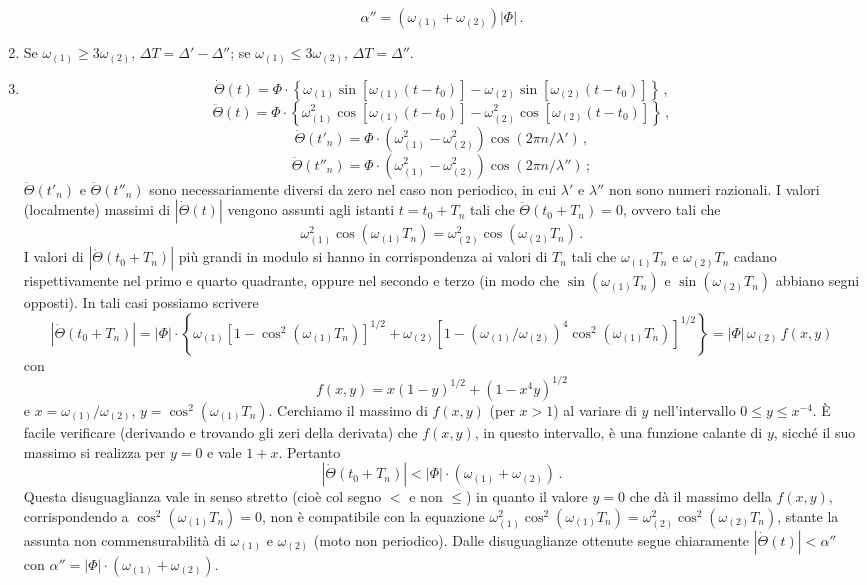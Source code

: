 \documentclass[11pt, a4paper]{book}
\numberwithin{equation}{section}
\begin{document}
\begin{enumerate}
\[        \alpha'' = (\omega_{(1)}+\omega_{(2)})|\Phi| \,.
    \]
    \item Se $\omega_{(1)} \geq 3\omega_{(2)}$, $\Delta T = \Delta' - \Delta''$; se
    $\omega_{(1)} \leq 3\omega_{(2)}$, $\Delta T = \Delta''$.
    \item
    \[
        \dot{\Theta}(t) = \Phi\cdot\left\{\omega_{(1)}\sin[\omega_{(1)}(t-t_0)]
        - \omega_{(2)}\sin[\omega_{(2)}(t-t_0)]\right\} \,,
    \]
    \[
        \ddot{\Theta}(t) = \Phi\cdot\left\{\omega_{(1)}^2\cos[\omega_{(1)}(t-t_0)]
        - \omega_{(2)}^2\cos[\omega_{(2)}(t-t_0)]\right\} \,,
    \]
    \[
        \ddot{\Theta}(t'_n) = \Phi\cdot(\omega_{(1)}^2-\omega_{(2)}^2)
        \cos(2\pi n/\lambda') \,,
    \]
    \[
        \ddot{\Theta}(t''_n) = \Phi\cdot(\omega_{(1)}^2-\omega_{(2)}^2)
        \cos(2\pi n/\lambda'') \,;
    \]
    $\ddot{\Theta}(t'_n)$ e $\ddot{\Theta}(t''_n)$ sono necessariamente diversi da
    zero nel caso non periodico, in cui $\lambda'$ e $\lambda''$ non sono numeri
    razionali. I valori (localmente) massimi di $|\dot{\Theta}(t)|$ vengono assunti
    agli istanti $t = t_0 + T_n$ tali che $\ddot{\Theta}(t_0+T_n)=0$, ovvero tali che
    \[
        \omega_{(1)}^2\cos(\omega_{(1)}T_n) = \omega_{(2)}^2\cos(\omega_{(2)}T_n) \,.
    \]
    I valori di $|\dot{\Theta}(t_0+T_n)|$ più grandi in modulo si hanno in
    corrispondenza ai valori di $T_n$ tali che $\omega_{(1)}T_n$ e $\omega_{(2)}T_n$
    cadano rispettivamente nel primo e quarto quadrante, oppure nel secondo e
    terzo (in modo che $\sin(\omega_{(1)}T_n)$ e $\sin(\omega_{(2)}T_n)$ abbiano
    segni opposti). In tali casi possiamo scrivere
    \[
        |\dot{\Theta}(t_0+T_n)| = |\Phi|\cdot\left\{
        \omega_{(1)}[1-\cos^2(\omega_{(1)}T_n)]^{1/2}
        + \omega_{(2)}[1-(\omega_{(1)}/\omega_{(2)})^4\cos^2(\omega_{(1)}T_n)]^{1/2}
        \right\} = |\Phi|\,\omega_{(2)}\,f(x,y)
    \]
    con
    \[
        f(x,y) = x(1-y)^{1/2} + (1-x^4 y)^{1/2}
    \]
    e $x = \omega_{(1)}/\omega_{(2)}$, $y = \cos^2(\omega_{(1)}T_n)$.
    Cerchiamo il massimo di $f(x,y)$ (per $x>1$) al variare di $y$
    nell'intervallo $0 \leq y \leq x^{-4}$. È facile verificare (derivando e
    trovando gli zeri della derivata) che $f(x,y)$, in questo intervallo, è una
    funzione calante di $y$, sicché il suo massimo si realizza per $y=0$ e vale
    $1+x$. Pertanto
    \[
        |\dot{\Theta}(t_0+T_n)| < |\Phi|\cdot(\omega_{(1)}+\omega_{(2)}) \,.
    \]
    Questa disuguaglianza vale in senso stretto (cioè col segno $<$ e non $\leq$)
    in quanto il valore $y=0$ che dà il massimo della $f(x,y)$, corrispondendo
    a $\cos^2(\omega_{(1)}T_n)=0$, non è compatibile con la equazione
    $\omega_{(1)}^2\cos^2(\omega_{(1)}T_n) = \omega_{(2)}^2\cos^2(\omega_{(2)}T_n)$,
    stante la assunta non commensurabilità di $\omega_{(1)}$ e $\omega_{(2)}$ (moto
    non periodico). Dalle disuguaglianze ottenute segue chiaramente
    $|\dot{\Theta}(t)| < \alpha''$ con $\alpha'' = |\Phi|\cdot(\omega_{(1)}+\omega_{(2)})$.
\end{enumerate}
\end{document}

